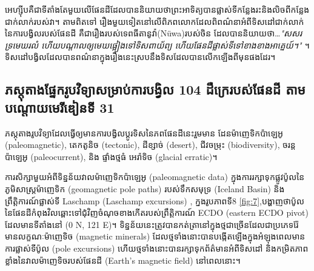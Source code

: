 \documentclass[10pt,twocolumn,letterpaper]{article}
\begin{document}
អេហ្ស៊ីបគឺជាទីតាំងតែមួយលើផែនដីដែលបាននិយាយថាព្រះអាទិត្យបានផ្លាស់ទីកន្លែងរះនិងលិចពីកន្លែងជាក់លាក់របស់វា។ តាមពិតទៅ រឿងមួយទៀតនៅលើពិភពលោកដែលពិពណ៌នាអំពីទិសដៅជាក់លាក់នៃការបង្វិលរបស់ផែនដី គឺជារឿងរបស់ទេពធីតានូវ៉ា(Nüwa)របស់ចិន ដែលបាននិយាយថា…\textit{"សសរទ្រមេឃរលំ ហើយបណ្តាលឲ្យមេឃផ្អៀងទៅទិសពាយ័ព្យ ហើយផែនដីផ្លាស់ទីទៅខាងខាងអាគ្នេយ៍។"} \cite{8}។ ទិសដៅបង្វិលដែលបានពណ៌នាក្នុងរឿងនេះស្របនឹងទិសដែលបានលើកឡើងពីមុនផងដែរ។

\subsection{ភស្តុតាងផ្នែករូបវិទ្យាសម្រាប់ការបង្វិល 104 ដឺក្រេរបស់ផែនដី តាមបណ្តោយមេរីឌៀនទី 31}

ភស្តុតាងរូបវិទ្យាដែលធ្វើឲ្យមានការបង្វិលប្តូរទិសនៃភពផែនដីនេះរួមមាន ដែនម៉ាញេទិកប៉ាឡេអូ (paleomagnetic), តេកតូនិច (tectonic), ដីខ្សាច់ (desert), ជីវចម្រុះ (biodiversity), ចរន្តប៉ាឡេអូ (paleocurrent), និង ផ្ទាំងថ្មធំ អេរ៉ាទិច (glacial erratic)។

ការសិក្សាមួយអំពីទិន្នន័យវាលម៉ាញេទិកប៉ាឡេអូ (paleomagnetic data) ក្នុងការរក្សាទុកផ្លូវប៉ូលនៃភូមិសាស្ត្រម៉ាញេទិក (geomagnetic pole paths) របស់ទឹកសមុទ្រ (Iceland Basin) និងព្រឹត្តិការណ៍ផ្លាស់ទី Laschamp (Laschamp excursions) \cite{35}, ក្នងរូបភាពទី8 \ref{fig:7},បង្ហាញថាប៉ូលនៃផែនដីកំពុងវិលឆ្ពោះទៅជុំវិញចំណុចខាងកើតរបស់ព្រឹត្តិការណ៍ ECDO (eastern ECDO pivot) ដែលមានទីតាំងនៅ (0 N, 121 E)។ ទិន្នន័យនេះត្រូវបានកត់ត្រានៅក្នុងថ្មជាច្រើនដែលជាប្រភេទរ៉ែមានលក្ខណៈម៉ាញេទិច (magnetic minerals) ដែលថ្មទាំងនោះបានបង្កើតឡើងក្នុងអំឡុងពេលមានការផ្លាស់ទីប៉ូល (pole excursions) ហើយថ្មទាំងនោះបានរក្សាទុកព័ត៌មានអំពីទិសដៅ និងកម្រិតភាពខ្លាំងនៃវាលម៉ាញេទិចរបស់ផែនដី (Earth’s magnetic field) នៅពេលនោះ។
\end{document}
